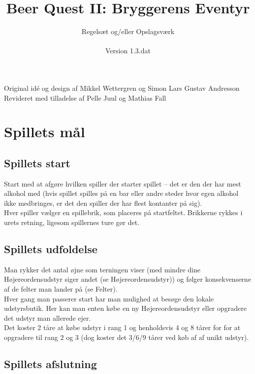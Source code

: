 \documentclass{article}
\title{Beer Quest II: Bryggerens Eventyr}
\author{Regelsæt og/eller Opslagsværk
\\ \\ Version 1.3.dat}
\date{}
\begin{document}
\maketitle

\begin{center}
Original idé og design af Mikkel Wettergren og Simon Lars Gustav Andresson \\
Revideret med tilladelse af Pelle Juul og Mathias Fall
\end{center}

\tableofcontents
\pagebreak

\section{Spillets mål}

\subsection{Spillets start}
 
Start med at afgøre hvilken spiller der starter spillet – det er den der har mest alkohol med (hvis spillet spilles på en bar eller andre steder hvor egen alkohol ikke medbringes, er det den spiller der har flest kontanter på sig).\\
Hver spiller vælger en spillebrik, som placeres på startfeltet. Brikkerne rykkes i urets retning, ligesom spillernes ture gør det. 

\subsection{Spillets udfoldelse}

Man rykker det antal øjne som terningen viser (med mindre dine Højereordensudstyr siger andet (se Højereordensudstyr)) og følger konsekvenserne af de felter man lander på (se Felter).
\\ Hver gang man passerer start har man mulighed at besøge den lokale udstyrsbutik. Her kan man enten købe en ny Højereordensudstyr eller opgradere det udstyr man allerede ejer. \\ Det koster 2 tåre at købe udstyr i rang 1 og henholdsvis 4 og 8 tårer for for at opgradere til rang 2 og 3 (dog koster det 3/6/9 tårer ved køb af af unikt udstyr).

\subsection{Spillets afslutning}
\end{document}

